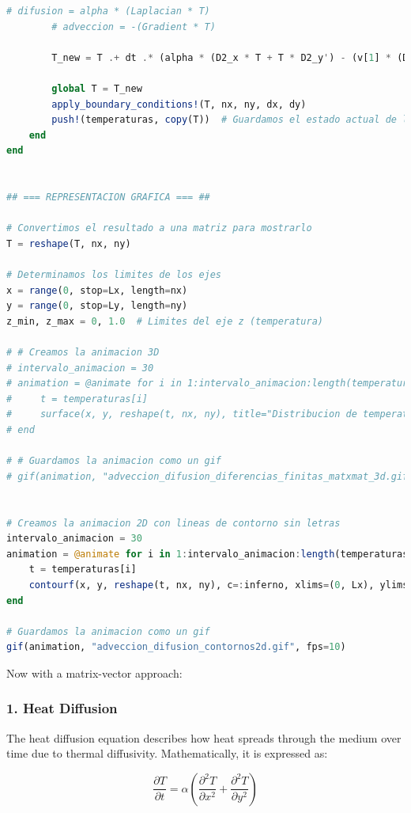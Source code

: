 \begin{lstlisting}[language=Julia]
        # difusion = alpha * (Laplacian * T)
        # adveccion = -(Gradient * T)

        T_new = T .+ dt .* (alpha * (D2_x * T + T * D2_y') - (v[1] * (D_x * T) + v[2] * (T * D_y')))
        
        global T = T_new
        apply_boundary_conditions!(T, nx, ny, dx, dy)
        push!(temperaturas, copy(T))  # Guardamos el estado actual de la temperatura
    end
end


## === REPRESENTACION GRAFICA === ##

# Convertimos el resultado a una matriz para mostrarlo
T = reshape(T, nx, ny)

# Determinamos los limites de los ejes
x = range(0, stop=Lx, length=nx)
y = range(0, stop=Ly, length=ny)
z_min, z_max = 0, 1.0  # Limites del eje z (temperatura)

# # Creamos la animacion 3D
# intervalo_animacion = 30
# animation = @animate for i in 1:intervalo_animacion:length(temperaturas)
#     t = temperaturas[i]
#     surface(x, y, reshape(t, nx, ny), title="Distribucion de temperatura [M][M]", xlabel="x", ylabel="y", zlabel="Temperatura", c=:inferno, xlims=(0, Lx), ylims=(0, Ly), zlims=(z_min, z_max))
# end

# # Guardamos la animacion como un gif
# gif(animation, "adveccion_difusion_diferencias_finitas_matxmat_3d.gif", fps=30)


# Creamos la animacion 2D con lineas de contorno sin letras
intervalo_animacion = 30
animation = @animate for i in 1:intervalo_animacion:length(temperaturas)
    t = temperaturas[i]
    contourf(x, y, reshape(t, nx, ny), c=:inferno, xlims=(0, Lx), ylims=(0, Ly), zlims=(z_min, z_max), xlabel="", ylabel="", title="", clabels=false)
end

# Guardamos la animacion como un gif
gif(animation, "adveccion_difusion_contornos2d.gif", fps=10)
\end{lstlisting}

Now with a matrix-vector approach:



\subsubsection*{1. Heat Diffusion}
The heat diffusion equation describes how heat spreads through the medium over time due to thermal diffusivity. Mathematically, it is expressed as:

\[
\frac{\partial T}{\partial t} = \alpha \left( \frac{\partial^2 T}{\partial x^2} + \frac{\partial^2 T}{\partial y^2} \right)
\]

